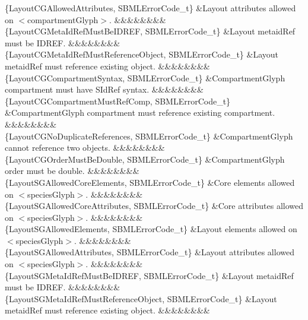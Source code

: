\begin{DoxyParagraph}{}
\begin{longtabu}
\{Layout\+C\+G\+Allowed\+Attributes, S\+B\+M\+L\+Error\+Code\+\_\+t\} &Layout attributes allowed on {\ttfamily $<$compartment\+Glyph$>$}. &&&&&&&&\\
\{Layout\+C\+G\+Meta\+Id\+Ref\+Must\+Be\+I\+D\+R\+EF, S\+B\+M\+L\+Error\+Code\+\_\+t\} &Layout \textquotesingle{}metaid\+Ref\textquotesingle{} must be I\+D\+R\+EF. &&&&&&&&\\
\{Layout\+C\+G\+Meta\+Id\+Ref\+Must\+Reference\+Object, S\+B\+M\+L\+Error\+Code\+\_\+t\} &Layout \textquotesingle{}metaid\+Ref\textquotesingle{} must reference existing object. &&&&&&&&\\
\{Layout\+C\+G\+Compartment\+Syntax, S\+B\+M\+L\+Error\+Code\+\_\+t\} &Compartment\+Glyph \textquotesingle{}compartment\textquotesingle{} must have S\+Id\+Ref syntax. &&&&&&&&\\
\{Layout\+C\+G\+Compartment\+Must\+Ref\+Comp, S\+B\+M\+L\+Error\+Code\+\_\+t\} &Compartment\+Glyph compartment must reference existing compartment. &&&&&&&&\\
\{Layout\+C\+G\+No\+Duplicate\+References, S\+B\+M\+L\+Error\+Code\+\_\+t\} &Compartment\+Glyph cannot reference two objects. &&&&&&&&\\
\{Layout\+C\+G\+Order\+Must\+Be\+Double, S\+B\+M\+L\+Error\+Code\+\_\+t\} &Compartment\+Glyph order must be double. &&&&&&&&\\
\{Layout\+S\+G\+Allowed\+Core\+Elements, S\+B\+M\+L\+Error\+Code\+\_\+t\} &Core elements allowed on {\ttfamily $<$species\+Glyph$>$}. &&&&&&&&\\
\{Layout\+S\+G\+Allowed\+Core\+Attributes, S\+B\+M\+L\+Error\+Code\+\_\+t\} &Core attributes allowed on {\ttfamily $<$species\+Glyph$>$}. &&&&&&&&\\
\{Layout\+S\+G\+Allowed\+Elements, S\+B\+M\+L\+Error\+Code\+\_\+t\} &Layout elements allowed on {\ttfamily $<$species\+Glyph$>$}. &&&&&&&&\\
\{Layout\+S\+G\+Allowed\+Attributes, S\+B\+M\+L\+Error\+Code\+\_\+t\} &Layout attributes allowed on {\ttfamily $<$species\+Glyph$>$}. &&&&&&&&\\
\{Layout\+S\+G\+Meta\+Id\+Ref\+Must\+Be\+I\+D\+R\+EF, S\+B\+M\+L\+Error\+Code\+\_\+t\} &Layout \textquotesingle{}metaid\+Ref\textquotesingle{} must be I\+D\+R\+EF. &&&&&&&&\\
\{Layout\+S\+G\+Meta\+Id\+Ref\+Must\+Reference\+Object, S\+B\+M\+L\+Error\+Code\+\_\+t\} &Layout \textquotesingle{}metaid\+Ref\textquotesingle{} must reference existing object. &&&&&&&&\\

\end{longtabu}
\end{DoxyParagraph}
